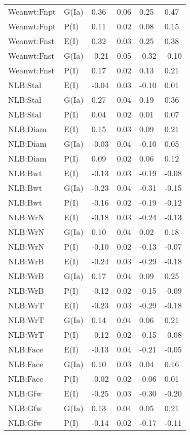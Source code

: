 \begin{center}
\begin{longtable}{|p{1.1in}|p{0.7in}|p{0.7in}|p{0.6in}|p{0.6in}|p{0.6in}|}
  Weanwt:Fnpt & G(Ia) & 0.36 & 0.06 & 0.25 & 0.47 \\ 
  Weanwt:Fnpt & P(I) & 0.11 & 0.02 & 0.08 & 0.15 \\ 
  Weanwt:Fnst & E(I) & 0.32 & 0.03 & 0.25 & 0.38 \\ 
  Weanwt:Fnst & G(Ia) & -0.21 & 0.05 & -0.32 & -0.10 \\ 
  Weanwt:Fnst & P(I) & 0.17 & 0.02 & 0.13 & 0.21 \\ 
  NLB:Stal & E(I) & -0.04 & 0.03 & -0.10 & 0.01 \\ 
  NLB:Stal & G(Ia) & 0.27 & 0.04 & 0.19 & 0.36 \\ 
  NLB:Stal & P(I) & 0.04 & 0.02 & 0.01 & 0.07 \\ 
  NLB:Diam & E(I) & 0.15 & 0.03 & 0.09 & 0.21 \\ 
  NLB:Diam & G(Ia) & -0.03 & 0.04 & -0.10 & 0.05 \\ 
  NLB:Diam & P(I) & 0.09 & 0.02 & 0.06 & 0.12 \\ 
  NLB:Bwt & E(I) & -0.13 & 0.03 & -0.19 & -0.08 \\ 
  NLB:Bwt & G(Ia) & -0.23 & 0.04 & -0.31 & -0.15 \\ 
  NLB:Bwt & P(I) & -0.16 & 0.02 & -0.19 & -0.12 \\ 
  NLB:WrN & E(I) & -0.18 & 0.03 & -0.24 & -0.13 \\ 
  NLB:WrN & G(Ia) & 0.10 & 0.04 & 0.02 & 0.18 \\ 
  NLB:WrN & P(I) & -0.10 & 0.02 & -0.13 & -0.07 \\ 
  NLB:WrB & E(I) & -0.24 & 0.03 & -0.29 & -0.18 \\ 
  NLB:WrB & G(Ia) & 0.17 & 0.04 & 0.09 & 0.25 \\ 
  NLB:WrB & P(I) & -0.12 & 0.02 & -0.15 & -0.09 \\ 
  NLB:WrT & E(I) & -0.23 & 0.03 & -0.29 & -0.18 \\ 
  NLB:WrT & G(Ia) & 0.14 & 0.04 & 0.06 & 0.21 \\ 
  NLB:WrT & P(I) & -0.12 & 0.02 & -0.15 & -0.08 \\ 
  NLB:Face & E(I) & -0.13 & 0.04 & -0.21 & -0.05 \\ 
  NLB:Face & G(Ia) & 0.10 & 0.03 & 0.04 & 0.16 \\ 
  NLB:Face & P(I) & -0.02 & 0.02 & -0.06 & 0.01 \\ 
  NLB:Gfw & E(I) & -0.25 & 0.03 & -0.30 & -0.20 \\ 
  NLB:Gfw & G(Ia) & 0.13 & 0.04 & 0.05 & 0.21 \\ 
  NLB:Gfw & P(I) & -0.14 & 0.02 & -0.17 & -0.11 \\ 

\end{longtable}
\end{center}
